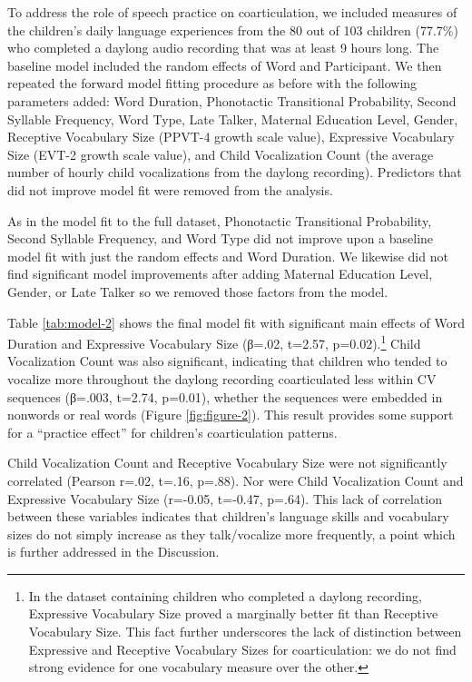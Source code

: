 \documentclass[a4paper,man,natbib,donotrepeattitle, apacite]{apa6}
\begin{document}
To address the role of speech practice on coarticulation, we included measures of the children’s daily language experiences from the 80 out of 103 children (77.7\%) who completed a daylong audio recording that was at least 9 hours long. The baseline model included the random effects of Word and Participant. We then repeated the forward model fitting procedure as before with the following parameters added: Word Duration, Phonotactic Transitional Probability, Second Syllable Frequency, Word Type, Late Talker, Maternal Education Level, Gender, Receptive Vocabulary Size (PPVT-4 growth scale value), Expressive Vocabulary Size (EVT-2 growth scale value), and Child Vocalization Count (the average number of hourly child vocalizations from the daylong recording). Predictors that did not improve model fit were removed from the analysis. 

As in the model fit to the full dataset, Phonotactic Transitional Probability, Second Syllable Frequency, and Word Type did not improve upon a baseline model fit with just the random effects and Word Duration. We likewise did not find significant model improvements after adding Maternal Education Level, Gender, or Late Talker so we removed those factors from the model. 

Table \ref{tab:model-2} shows the final model fit with significant main effects of Word Duration and Expressive Vocabulary Size (β=.02, t=2.57, p=0.02).\footnote{In the dataset containing children who completed a daylong recording, Expressive Vocabulary Size proved a marginally better fit than Receptive Vocabulary Size. This fact further underscores the lack of distinction between Expressive and Receptive Vocabulary Sizes for coarticulation: we do not find strong evidence for one vocabulary measure over the other.} Child Vocalization Count was also significant, indicating that children who tended to vocalize more throughout the daylong recording coarticulated less within CV sequences (β=.003, t=2.74, p=0.01), whether the sequences were embedded in nonwords or real words (Figure \ref{fig:figure-2}). This result provides some support for a ``practice effect'' for children’s coarticulation patterns.

Child Vocalization Count and Receptive Vocabulary Size were not significantly correlated (Pearson r=.02, t=.16, p=.88). Nor were Child Vocalization Count and Expressive Vocabulary Size (r=-0.05, t=-0.47, p=.64). This lack of correlation between these variables indicates that children’s language skills and vocabulary sizes do not simply increase as they talk/vocalize more frequently, a point which is further addressed in the Discussion.
\end{document}

